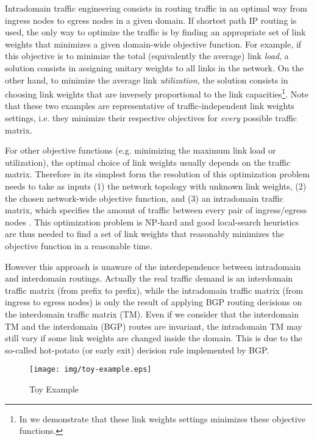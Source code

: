 \documentclass{acm_proc_article-sp}
\begin{document}
Intradomain traffic engineering consists in routing traffic in an
optimal way from ingress nodes to egress nodes in a given domain. If
shortest path IP routing is used, the only way to optimize the traffic
is by finding an appropriate set of link weights that minimizes a
given domain-wide objective function. For example, if this objective
is to minimize the total (equivalently the average) link \textit{load}, a
solution consists in assigning unitary weights to all links in the
network. On the other hand, to minimize the average link
\textit{utilization}, the solution consists in choosing link
weights that are inversely proportional to the link
capacities\footnote{In \cite{balon-icon06} we demonstrate that these
  link weights settings minimizes these objective functions.}. Note
that these two examples are representative of traffic-independent link weights
settings, i.e. they minimize their respective objectives for \textit{every} possible
traffic matrix. 

For other objective functions (e.g. minimizing the maximum link load
or utilization), the optimal choice of link weights usually depends on
the traffic matrix. Therefore in its simplest form the resolution of
this optimization problem needs to take as inputs (1) the network
topology with unknown link weights, (2) the chosen network-wide objective
function, and (3) an intradomain traffic matrix, which specifies the
amount of traffic between every pair of ingress/egress nodes
\cite{fortz1}. This optimization problem is NP-hard and good
local-search heuristics are thus needed to find a set of link weights that
reasonably minimizes the objective function in a reasonable time. 

However this approach is unaware of the interdependence between
intradomain and interdomain routings. Actually the real traffic demand
is an interdomain traffic matrix (from prefix to prefix), while the
intradomain traffic matrix (from ingress to egress nodes) is only the
result of applying BGP routing decisions on the interdomain traffic
matrix (TM). Even if we consider that the interdomain TM and the
interdomain (BGP) routes are invariant, the intradomain TM may still
vary if some link weights are changed inside the domain. This is due to
the so-called hot-potato (or early exit) decision rule implemented by BGP. 

\begin{figure}[htbp]
  \centering
  \texttt{[image: img/toy-example.eps]}
  \caption{Toy Example}
  \label{fig:toyexample}
\end{figure}
\end{document}
